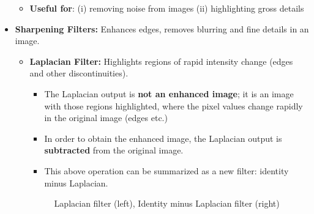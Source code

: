 \begin{itemize}
\begin{itemize}
      \item \textbf{Useful for}: (i) removing noise from images (ii)
        highlighting gross details
    \end{itemize}
  \item \textbf{Sharpening Filters:} Enhances edges, removes blurring
    and fine details in an image.
    \begin{itemize}
      \item \textbf{Laplacian Filter:} Highlights regions of rapid
        intensity change (edges and other discontinuities).
        \begin{itemize}
          \item The Laplacian output is \textbf{not an enhanced
            image}; it is an image with those regions highlighted,
            where the pixel values change rapidly in the original
            image (edges etc.)
          \item In order to obtain the enhanced image, the Laplacian
            output is \textbf{subtracted} from the original image.
          \item This above operation can be summarized as a new
            filter: identity minus Laplacian.
        \end{itemize}

        \begin{minipage}{\linewidth}
          \vspace{-0.3cm}
          \begin{figure}[H]
            \centering
            \caption{Laplacian filter (left), Identity minus
            Laplacian filter (right)}
          \end{figure}
        \end{minipage}


\end{itemize}
\end{itemize}
